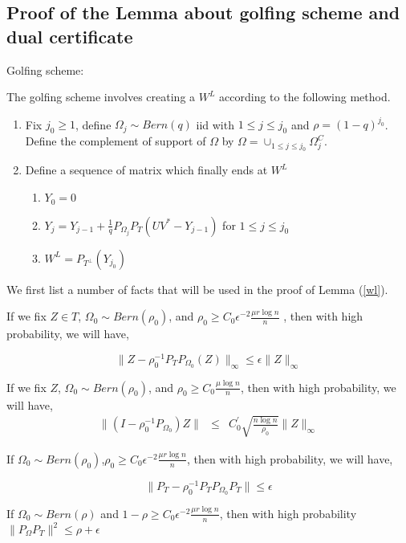\newpage
\subsection{Proof of the Lemma about golfing scheme and dual certificate }
Golfing scheme:

The golfing scheme involves creating a $W^{L}$ according to the following method.
\begin{enumerate}
\item Fix $j_{0}\ge1$, define $\Omega_{j}\sim Bern(q)$ iid with $1\le j\le j_{0}$ and $\rho=(1-q)^{j_{0}}$. Define the complement of support of $\Omega$ by $\Omega=\cup_{1\le j\le j_{0}}\Omega_{j}^{C}$.
\item Define a sequence of matrix which finally ends at $W^{L}$

\begin{enumerate}
\item $Y_{0}=0$
\item $Y_{j}=Y_{j-1}+\frac{1}{q}P_{\Omega_{j}}P_{T}(UV^{*}-Y_{j-1})$ for $1\le j\le j_{0}$
\item $W^{L}=P_{\ensuremath{T^{\bot}}}(Y_{j_{0}})$
\end{enumerate}

\end{enumerate}

We first list a number of facts that will be used in the proof of Lemma (\ref{wl}).

\begin{fact}
\label{fact2}
If we fix $Z\in T$, $\Omega_{0}\sim Bern(\rho_{0})$, and $\rho_{0}\ge C_{0}\epsilon^{-2}\frac{\mu r\log n}{n}$ , then with high probability, we will have,

\label{fact5}
\[
\|Z-\rho_{0}^{-1}P_{T}P_{\Omega_{0}}(Z)\|_{\infty}\le\epsilon\|Z\|_{\infty}
\]

\begin{fact}
\label{fact3}
If we fix $Z$, $\Omega_{0}\sim Bern(\rho_{0})$, and $\rho_{0}\ge C_{0}\frac{\mu\log n}{n}$, then with high probability,
we will have,
\begin{eqnarray*}
\|(I-\rho_{0}^{-1}P_{\Omega_{0}})Z\| & \le & C_{0}^{'}\sqrt{\frac{n\log n}{\rho_{0}}}\|Z\|_{\infty}
\end{eqnarray*}

\begin{fact}
\label{fact4}
If $\Omega_{0}\sim Bern(\rho_{0})$,$\rho_{0}\ge C_{0}\epsilon^{-2}\frac{\mu r\log n}{n}$, then with high probability, we will have,

\[
\|P_{T}-\rho_{0}^{-1}P_{T}P_{\Omega_{0}}P_{T}\|\le\epsilon
\]

\begin{fact}
If $\Omega_{0}\sim Bern(\rho)$ and $1-\rho\ge C_{0}\epsilon^{-2}\frac{\mu r\log n}{n}$, then with high probability $\|P_{\Omega}P_{T}\|^{2}\le\rho+\epsilon$
\end{fact}
\end{fact}
\end{fact}
\end{fact}


